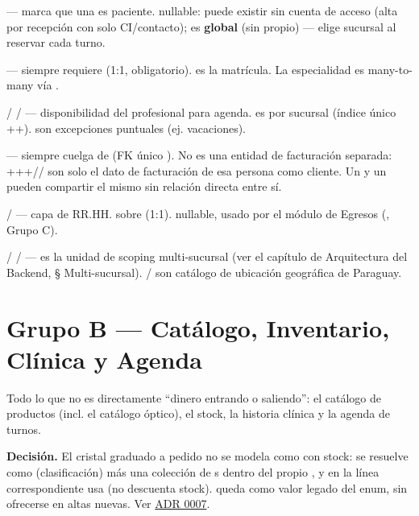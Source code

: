  --- marca que una  es paciente.  nullable: puede existir sin cuenta de acceso (alta por recepción con solo CI/contacto); es \textbf{global} (sin  propio) --- elige sucursal al reservar cada turno.

 --- siempre requiere  (1:1, obligatorio).  es la matrícula. La especialidad es many-to-many vía \allowbreak {}.

\allowbreak {} /  /  --- disponibilidad del profesional para agenda. \allowbreak {} es por sucursal (índice único ++).  son excepciones puntuales (ej. vacaciones).

 --- siempre cuelga de  (FK único ). No es una entidad de facturación separada: +++// son solo el dato de facturación de esa persona como cliente. Un  y un  pueden compartir el mismo  sin relación directa entre sí.

 /  --- capa de RR.HH. sobre  (1:1).  nullable, usado por el módulo de Egresos (, Grupo C).

 /  /  ---  es la unidad de scoping multi-sucursal (ver el capítulo de Arquitectura del Backend, § Multi-sucursal). / son catálogo de ubicación geográfica de Paraguay.

\clearpage
\section{Grupo B --- Catálogo, Inventario, Clínica y Agenda}
\label{sec:modelo-grupo-b}

Todo lo que no es directamente ``dinero entrando o saliendo'': el catálogo de productos (incl. el catálogo óptico), el stock, la historia clínica y la agenda de turnos.

\textbf{Decisión.} El cristal graduado a pedido no se modela como  con stock: se resuelve como  (clasificación) más una colección de s dentro del propio , y en  la línea correspondiente usa  (no descuenta stock).  queda como valor legado del enum, sin ofrecerse en altas nuevas. Ver \hyperref[adr:0007]{ADR 0007}.

